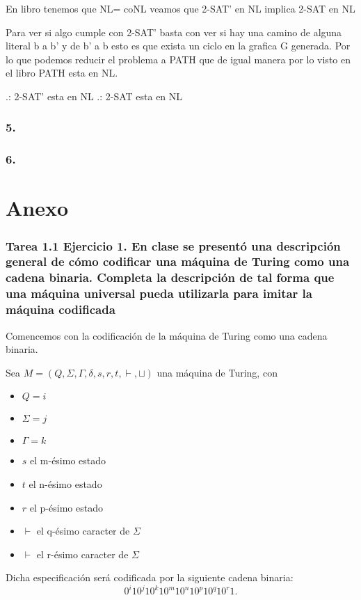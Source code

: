 \documentclass[12pt]{article}
\begin{document}
En libro tenemos que NL= coNL veamos que 2-SAT’ en NL implica 2-SAT en NL

Para ver si algo cumple con 2-SAT’ basta con ver si hay una camino de alguna literal b a b’ y de b’ a b esto es que exista un ciclo en la grafica G generada. Por lo que podemos reducir el problema a PATH que de igual manera por lo visto en el libro PATH esta en NL.

.: 2-SAT’ esta en NL 
.: 2-SAT esta en NL

\subsubsection*{5.}

\subsubsection*{6.}

\newpage
\section*{Anexo}

\subsubsection*{Tarea 1.1 Ejercicio 1. En clase se presentó una descripción general de cómo codificar una máquina de Turing como una cadena binaria. Completa la descripción de tal forma que una máquina universal pueda utilizarla para imitar la máquina codificada}

Comencemos con la codificación de la máquina de Turing como una cadena binaria.

Sea $M = (Q,\Sigma,\Gamma,\delta,s,r,t,\vdash,\sqcup)$ una máquina de Turing, con
\begin{itemize}
\item $Q = i$
\item $\Sigma = j$
\item $\Gamma = k$
\item $s$ el m-ésimo estado
\item $t$ el n-ésimo estado
\item $r$ el p-ésimo estado
\item $\vdash$ el q-ésimo caracter de $\Sigma$
\item $\vdash$ el r-ésimo caracter de $\Sigma$ 
\end{itemize}
Dicha especificación será codificada por la siguiente cadena binaria:\\
\begin{equation}
  0^i10^j10^k10^m10^n10^p10^q10^r1.
\end{equation}
\end{document}
